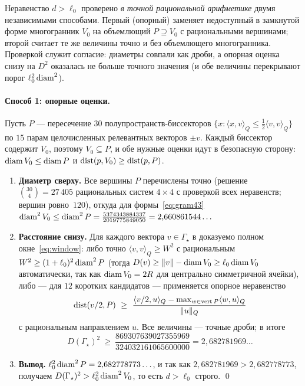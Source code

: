 Неравенство $d>\ell_0$ проверено \emph{в точной рациональной арифметике}
двумя независимыми способами. Первый (опорный) заменяет недоступный в
замкнутой форме многогранник $V_0$ на объемлющий $P\supseteq V_0$ с
рациональными вершинами; второй считает те же величины точно и без
объемлющего многогранника. Проверкой служит согласие: диаметры совпали как
дроби, а опорная оценка снизу на $D^2$ оказалась не больше точного значения
(и обе величины перекрывают порог $\ell_0^2\operatorname{diam}^2$).

\paragraph{Способ 1: опорные оценки.}
Пусть $P$ --- пересечение $30$ полупространств-биссекторов
$\{x:\langle x,v\rangle_Q\le\tfrac12\langle v,v\rangle_Q\}$ по $15$ парам
целочисленных релевантных векторов $\pm v$. Каждый биссектор содержит $V_0$,
поэтому $V_0\subseteq P$, и обе нужные оценки идут в безопасную сторону:
$\operatorname{diam} V_0\le\operatorname{diam} P$ и $\operatorname{dist}(p,V_0)\ge\operatorname{dist}(p,P)$.
\begin{enumerate}[leftmargin=1.8em]
\item[(а)] \textbf{Диаметр сверху.} Все вершины $P$ перечислены точно (решение
$\binom{30}{4}=27\,405$ рациональных систем $4\times4$ с проверкой всех
неравенств; вершин ровно~$120$), откуда для формы~\eqref{eq:gram43}
$\operatorname{diam}^2V_0\le\operatorname{diam}^2P=\tfrac{5374343884337}{2019775849050}
=2{,}660861544\ldots$
\item[(б)] \textbf{Расстояние снизу.} Для каждого вектора $v\in\Gamma_\star$ в
доказуемо полном окне~\eqref{eq:window}: либо точно
$\langle v,v\rangle_Q\ge W^2$ с рациональным $W^2\ge(1+\ell_0)^2\operatorname{diam}^2P$
(тогда $D(v)\ge\|v\|-\operatorname{diam} V_0\ge\ell_0\operatorname{diam} V_0$ автоматически, так как
$\operatorname{diam} V_0=2R$ для центрально симметричной ячейки), либо --- для $12$ коротких
кандидатов --- применяется опорное неравенство
\[
\operatorname{dist}(v/2,P)\ \ge\
\frac{\langle v/2,u\rangle_Q-\max_{w\in\mathrm{vert}\,P}\langle w,u\rangle_Q}
{\|u\|_Q}
\]
с рациональным направлением $u$. Все величины --- точные дроби; в итоге
\[
D(\Gamma_\star)^2\ \ge\ \frac{869307639027355969}{324032161065600000}
=2{,}682781969\ldots
\]
\item[(в)] \textbf{Вывод.} $\ell_0^2\operatorname{diam}^2P=2{,}682778773\ldots$, и так как
$2{,}682781969>2{,}682778773$, получаем $D(\Gamma_\star)^2>\ell_0^2\operatorname{diam}^2V_0$,
то есть $d>\ell_0$ строго. \qed
\end{enumerate}


